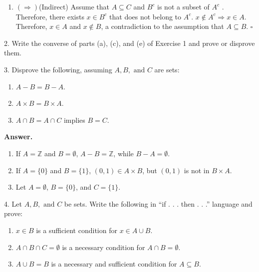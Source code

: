 \documentclass[10pt,]{book}
\theoremstyle{plain}
\theoremstyle{definition}
\theoremstyle{definition}
\theoremstyle{definition}
\begin{document}
\begin{exercisegroup}
\begin{enumerate}[label=\alph*]
\item\hypertarget{li-13}{} \((\Rightarrow )\)(Indirect) Assume that \(A\subseteq C\) and \(B^c\) is not a subset of \(A^c\) . Therefore, there exists \(x\in B^c\) that does not  belong to \(A^c\). \(x \notin  A^c \Rightarrow  x \in  A\). Therefore, \(x\in A\) and \(x\notin B\), a contradiction to the assumption that \(A\subseteq B\). \(\square\)%
\end{enumerate}
%
\item[2.]\hypertarget{exercise-2}{}Write the converse of parts (a), (c), and (e) of Exercise 1 and prove or disprove them.%
\par\smallskip
\item[3.]\hypertarget{exercise-3}{}  Disprove the following, assuming \(A, B, \textrm{ and } C\) are sets:%
\par
\leavevmode%
\begin{enumerate}[label=\alph*]
\item\hypertarget{li-14}{}\(A - B = B - A\).%
\item\hypertarget{li-15}{}\(A\times B = B\times A\).%
\item\hypertarget{li-16}{}\(A \cap   B = A  \cap   C\) implies \(B = C\).%
\end{enumerate}
%
\par\smallskip
\par\smallskip
\noindent\textbf{Answer.}\hypertarget{answer-2}{}\quad
\leavevmode%
\begin{enumerate}[label=\alph*]
\item\hypertarget{li-17}{} If \(A = \mathbb{Z}\) and \(B=\emptyset\), \(A - B = \pmb{\mathbb{Z}}\), while \(B - A = \emptyset\).%
\item\hypertarget{li-18}{} If \(A=\{0\}\) and \(B = \{1\}\), \((0,1) \in  A \times  B\), but \((0, 1)\) is not in \(B\times A\).%
\item\hypertarget{li-19}{}Let \(A = \emptyset\), \(B = \{0\}\), and \(C = \{1\}\). %
\end{enumerate}
%
\item[4.]\hypertarget{exercise-4}{}  Let \(A, B, \textrm{ and } C\) be sets. Write the following in ``if . . . then . . .'' language and prove:%
\par
\leavevmode%
\begin{enumerate}[label=\alph*]
\item\hypertarget{li-20}{}\(x \in  B\) is a sufficient condition for \(x \in  A \cup B\).%
\item\hypertarget{li-21}{}\(A \cap B\cap C = \emptyset\) is a necessary condition for \(A \cap  B =\emptyset\).%
\item\hypertarget{li-22}{}\(A \cup  B = B\) is a necessary and sufficient condition for \(A\subseteq  B\).%
\end{enumerate}
%
\par\smallskip
\end{exercisegroup}
\end{document}
